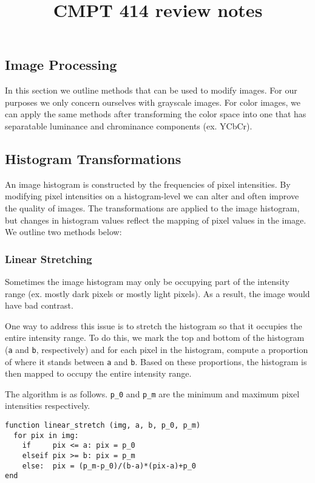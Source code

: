 \documentclass{article}
\title{CMPT 414 review notes}
\author{}
\date{}
\begin{document}
\maketitle

\begin{multicols}{2}

\section{Image Processing}

In this section we outline methods that can be used to modify images. For our purposes we only concern ourselves with grayscale images. For color images, we can apply the same methods after transforming the color space into one that has separatable luminance and chrominance components (ex. YCbCr).

\subsection{Histogram Transformations}

An image histogram is constructed by the frequencies of pixel intensities. By modifying pixel intensities on a histogram-level we can alter and often improve the quality of images. The transformations are applied to the image histogram, but changes in histogram values reflect the mapping of pixel values in the image. We outline two methods below:

\subsubsection{Linear Stretching}

Sometimes the image histogram may only be occupying part of the intensity range (ex. mostly dark pixels or mostly light pixels). As a result, the image would have bad contrast.

One way to address this issue is to stretch the histogram so that it occupies the entire intensity range. To do this, we mark the top and bottom of the histogram (\texttt{a} and \texttt{b}, respectively) and for each pixel in the histogram, compute a proportion of where it stands between \texttt{a} and \texttt{b}. Based on these proportions, the histogram is then mapped to occupy the entire intensity range.

The algorithm is as follows. \texttt{p\_0} and \texttt{p\_m} are the minimum and maximum pixel intensities respectively.

\begin{verbatim}
function linear_stretch (img, a, b, p_0, p_m)
  for pix in img:
    if     pix <= a: pix = p_0
    elseif pix >= b: pix = p_m
    else:  pix = (p_m-p_0)/(b-a)*(pix-a)+p_0
end
\end{verbatim}


\end{multicols}
\end{document}

